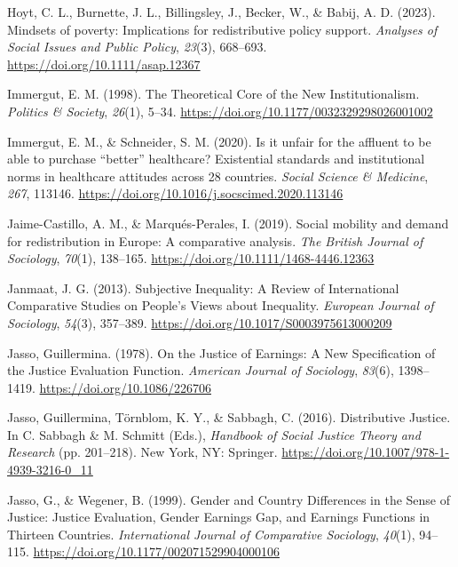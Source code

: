 \documentclass[
  12pt,
]{article}
\newlength{\cslhangindent}
\newenvironment{CSLReferences}[2] %
 {\begin{list}{}{%
  \setlength{\itemindent}{0pt}
  \setlength{\leftmargin}{0pt}
  \setlength{\parsep}{0pt}
  \ifodd #1
   \setlength{\leftmargin}{\cslhangindent}
   \setlength{\itemindent}{-1\cslhangindent}
  \fi
  \setlength{\itemsep}{#2\baselineskip}}}
 {\end{list}}
\begin{document}
\begin{CSLReferences}{1}{0}
Hoyt, C. L., Burnette, J. L., Billingsley, J., Becker, W., \& Babij, A.
D. (2023). Mindsets of poverty: {Implications} for redistributive policy
support. \emph{Analyses of Social Issues and Public Policy},
\emph{23}(3), 668--693. \url{https://doi.org/10.1111/asap.12367}

Immergut, E. M. (1998). The {Theoretical Core} of the {New
Institutionalism}. \emph{Politics \& Society}, \emph{26}(1), 5--34.
\url{https://doi.org/10.1177/0032329298026001002}

Immergut, E. M., \& Schneider, S. M. (2020). Is it unfair for the
affluent to be able to purchase {``better''} healthcare? {Existential}
standards and institutional norms in healthcare attitudes across 28
countries. \emph{Social Science \& Medicine}, \emph{267}, 113146.
\url{https://doi.org/10.1016/j.socscimed.2020.113146}

Jaime-Castillo, A. M., \& Marqués-Perales, I. (2019). Social mobility
and demand for redistribution in {Europe}: A comparative analysis.
\emph{The British Journal of Sociology}, \emph{70}(1), 138--165.
\url{https://doi.org/10.1111/1468-4446.12363}

Janmaat, J. G. (2013). Subjective {Inequality}: A {Review} of
{International Comparative Studies} on {People}'s {Views} about
{Inequality}. \emph{European Journal of Sociology}, \emph{54}(3),
357--389. \url{https://doi.org/10.1017/S0003975613000209}

Jasso, Guillermina. (1978). On the {Justice} of {Earnings}: {A New
Specification} of the {Justice Evaluation Function}. \emph{American
Journal of Sociology}, \emph{83}(6), 1398--1419.
\url{https://doi.org/10.1086/226706}

Jasso, Guillermina, Törnblom, K. Y., \& Sabbagh, C. (2016). Distributive
{Justice}. In C. Sabbagh \& M. Schmitt (Eds.), \emph{Handbook of {Social
Justice Theory} and {Research}} (pp. 201--218). New York, NY: Springer.
\url{https://doi.org/10.1007/978-1-4939-3216-0_11}

Jasso, G., \& Wegener, B. (1999). Gender and {Country Differences} in
the {Sense} of {Justice}: {Justice Evaluation}, {Gender Earnings Gap},
and {Earnings Functions} in {Thirteen Countries}. \emph{International
Journal of Comparative Sociology}, \emph{40}(1), 94--115.
\url{https://doi.org/10.1177/002071529904000106}


\end{CSLReferences}
\end{document}
